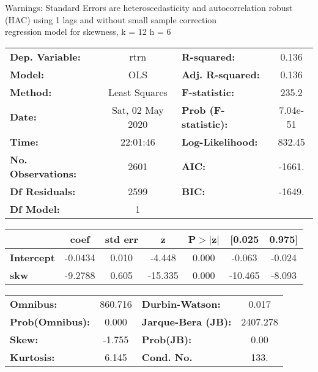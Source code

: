 Warnings: \newline
 [1] Standard Errors are heteroscedasticity and autocorrelation robust (HAC) using 1 lags and without small sample correction\\ 

regression model for skewness, k = 12 h = 6\begin{center}
\begin{tabular}{lclc}
\toprule
\textbf{Dep. Variable:}    &       rtrn       & \textbf{  R-squared:         } &     0.136   \\
\textbf{Model:}            &       OLS        & \textbf{  Adj. R-squared:    } &     0.136   \\
\textbf{Method:}           &  Least Squares   & \textbf{  F-statistic:       } &     235.2   \\
\textbf{Date:}             & Sat, 02 May 2020 & \textbf{  Prob (F-statistic):} &  7.04e-51   \\
\textbf{Time:}             &     22:01:46     & \textbf{  Log-Likelihood:    } &    832.45   \\
\textbf{No. Observations:} &        2601      & \textbf{  AIC:               } &    -1661.   \\
\textbf{Df Residuals:}     &        2599      & \textbf{  BIC:               } &    -1649.   \\
\textbf{Df Model:}         &           1      & \textbf{                     } &             \\
\bottomrule
\end{tabular}
\begin{tabular}{lcccccc}
                   & \textbf{coef} & \textbf{std err} & \textbf{z} & \textbf{P$> |$z$|$} & \textbf{[0.025} & \textbf{0.975]}  \\
\midrule
\textbf{Intercept} &      -0.0434  &        0.010     &    -4.448  &         0.000        &       -0.063    &       -0.024     \\
\textbf{skw}       &      -9.2788  &        0.605     &   -15.335  &         0.000        &      -10.465    &       -8.093     \\
\bottomrule
\end{tabular}
\begin{tabular}{lclc}
\textbf{Omnibus:}       & 860.716 & \textbf{  Durbin-Watson:     } &    0.017  \\
\textbf{Prob(Omnibus):} &   0.000 & \textbf{  Jarque-Bera (JB):  } & 2407.278  \\
\textbf{Skew:}          &  -1.755 & \textbf{  Prob(JB):          } &     0.00  \\
\textbf{Kurtosis:}      &   6.145 & \textbf{  Cond. No.          } &     133.  \\
\bottomrule
\end{tabular}
\end{center}

